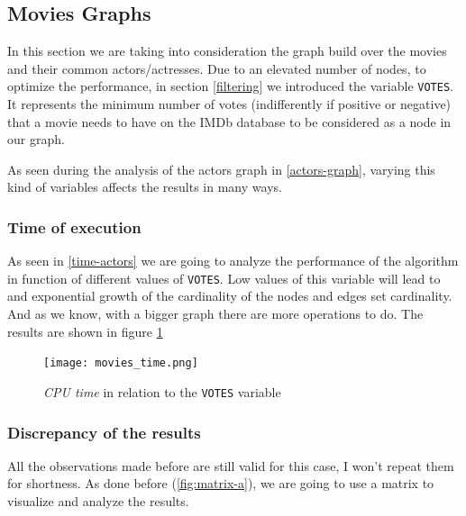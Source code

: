 \s
\newpage
\subsection{Movies Graphs}
In this section we are taking into consideration the graph build over the movies and their common actors/actresses. Due to an elevated number of nodes, to optimize the performance, in section \ref{filtering} we introduced the variable \texttt{VOTES}. It represents the minimum number of votes (indifferently if positive or negative) that a movie needs to have on the IMDb database to be considered as a node in our graph.

As seen during the analysis of the actors graph in \ref{actors-graph}, varying this kind of variables affects the results in many ways.

\subsubsection{Time of execution}

As seen in \ref{time-actors} we are going to analyze the performance of the algorithm in function of different values of \texttt{VOTES}. Low values of this variable will lead to and exponential growth of the cardinality of the nodes and edges set cardinality. And as we know, with a bigger graph there are more operations to do. The results are shown in figure \ref{fig:moves_time}

\begin{figure}[h!]
    \centering
    \texttt{[image: movies\_time.png]}
    \caption{\emph{CPU time} in relation to the \texttt{VOTES} variable}
    \label{fig:moves_time}
\end{figure}

\newpage


\subsubsection{Discrepancy of the results}

All the observations made before are still valid for this case, I won't repeat them for shortness. As done before (\ref{fig:matrix-a}), we are going to use a matrix to visualize and analyze the results.
\s

% 

